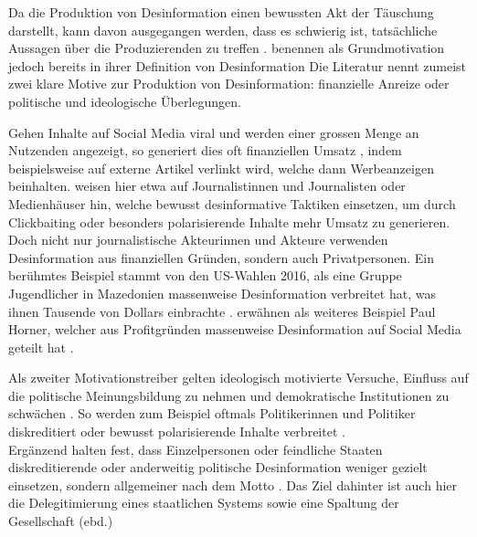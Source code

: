 \documentclass[12pt,a4paper]{article}        %
\begin{document}
Da die Produktion von Desinformation einen bewussten Akt der Täuschung darstellt, kann davon ausgegangen werden, dass es schwierig ist, tatsächliche Aussagen über die Produzierenden zu treffen \parencite[73]{lecheler_disinformation_2022}. \textcite[39]{pennycook_lazy_2019} benennen als Grundmotivation jedoch bereits in ihrer Definition von Desinformation  Die Literatur nennt zumeist zwei klare Motive zur Produktion von Desinformation: finanzielle Anreize oder politische und ideologische Überlegungen.

Gehen Inhalte auf Social Media viral und werden einer grossen Menge an Nutzenden angezeigt, so generiert dies oft finanziellen Umsatz \parencites[217]{allcott_social_2017}[3]{tandoc_jr_facts_2019}[157]{marx_fake_2020}, indem beispielsweise auf externe Artikel verlinkt wird, welche dann Werbeanzeigen beinhalten. \textcite[76]{lecheler_disinformation_2022} weisen hier etwa auf Journalistinnen und Journalisten oder Medienhäuser hin, welche bewusst desinformative Taktiken einsetzen, um durch Clickbaiting oder besonders polarisierende Inhalte mehr Umsatz zu generieren. \\
Doch nicht nur journalistische Akteurinnen und Akteure verwenden Desinformation aus finanziellen Gründen, sondern auch Privatpersonen. Ein berühmtes Beispiel stammt von den US-Wahlen 2016, als eine Gruppe Jugendlicher in Mazedonien massenweise Desinformation verbreitet hat, was ihnen Tausende von Dollars einbrachte \parencites[217]{allcott_social_2017}[vgl.\ auch][]{subramanian_meet_2017}[3]{tandoc_jr_facts_2019}. \textcite[217]{allcott_social_2017} erwähnen als weiteres Beispiel Paul Horner, welcher aus Profitgründen massenweise Desinformation auf Social Media geteilt hat \parencite[vgl.\ auch][]{dewey_facebook_2016}.

Als zweiter Motivationstreiber gelten ideologisch motivierte Versuche, Einfluss auf die politische Meinungsbildung zu nehmen und demokratische Institutionen zu schwächen \parencites[225]{schmidt_meinungsbildung_2022}[75]{lecheler_disinformation_2022}[157]{marx_fake_2020}. So werden zum Beispiel oftmals Politikerinnen und Politiker diskreditiert \parencites[3]{tandoc_jr_facts_2019}[217]{allcott_social_2017} oder bewusst polarisierende Inhalte verbreitet \parencites[8]{european_parliament_directorate-general_for_external_policies_of_the_union_impact_2021}[3]{tandoc_jr_facts_2019}.\\
Ergänzend halten \textcite[182]{weidner_fake_2019} fest, dass Einzelpersonen oder feindliche Staaten diskreditierende oder anderweitig politische Desinformation weniger gezielt einsetzen, sondern allgemeiner nach dem Motto . Das Ziel dahinter ist auch hier die Delegitimierung eines staatlichen Systems sowie eine Spaltung der Gesellschaft (ebd.)
\end{document}

